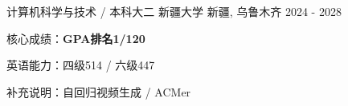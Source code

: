 \vspace{-3mm}
\vspace{-3mm}
\begin{cventries}
  \cventry
    {计算机科学与技术 / 本科大二} %
    {新疆大学} %
    {新疆, 乌鲁木齐} %
    {2024 - 2028} %
    {
      \vspace{-4mm}
      \begin{cvitems}
        \item {核心成绩：\textbf{GPA排名1/120}} %
        \item {英语能力：四级514 / 六级447} %
        \item {补充说明：自回归视频生成 / ACMer} %
      \end{cvitems}
    }
\end{cventries}
